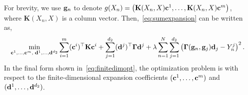 For brevity, we use $\mathbf{g}_n$ to denote $g(X_n) = \left(\mathbf{K}(X_n, X) \mathbf{c}^1, \dots, \mathbf{K}(X_n, X) \mathbf{c}^m \right)$, where $\mathbf{K}(X_n, X)$ is a column vector. Then,~\eqref{eq:sumexpansion} can be written as,
\begin{align}
\min_{\mathbf{c}^1,\ldots,\mathbf{c}^m,\; \mathbf{d}^1,\ldots,\mathbf{d}^{d_2}} 
\sum_{i=1}^m (\mathbf{c}^i)^\top \mathbf{K} \mathbf{c}^i
+ \sum_{j=1}^{d_2} (\mathbf{d}^j)^\top \mathbf{\Gamma} \mathbf{d}^j
+ \lambda \sum\limits_{n=1}^N \sum\limits_{j=1}^{d_2} \left( \mathbf{\Gamma}(\mathbf{g}_n, \mathbf{g}_j) \mathbf{d}_j - Y^j_n \right)^2. \label{eq:finitedimopt}
\end{align}
In the final form shown in~\eqref{eq:finitedimopt}, the optimization problem is with respect to the finite-dimensional expansion coefficients $(\mathbf{c}^1, \dots, \mathbf{c}^m)$ and $(\mathbf{d}^1, \dots, \mathbf{d}^{d_2})$.
